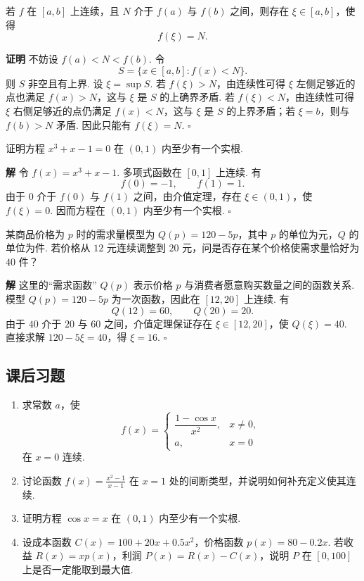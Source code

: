 \documentclass[fontset=fandol]{ctexart}
\newenvironment{proofdetail}{\par\noindent\textbf{证明}\quad}{\hfill$\square$\par\vspace{0.8em}}
\newenvironment{solution}{\par\noindent\textbf{解}\quad}{\hfill$\square$\par\vspace{0.8em}}
\begin{document}
\begin{theorem}[介值定理]
若 $f$ 在 $[a,b]$ 上连续，且 $N$ 介于 $f(a)$ 与 $f(b)$ 之间，则存在 $\xi\in[a,b]$，使得
\[
f(\xi)=N.
\]
\end{theorem}
\begin{proofdetail}
不妨设 $f(a)<N<f(b)$. 令
\[
S=\{x\in[a,b]:f(x)<N\}.
\]
则 $S$ 非空且有上界. 设 $\xi=\sup S$. 若 $f(\xi)>N$，由连续性可得 $\xi$ 左侧足够近的点也满足 $f(x)>N$，这与 $\xi$ 是 $S$ 的上确界矛盾. 若 $f(\xi)<N$，由连续性可得 $\xi$ 右侧足够近的点仍满足 $f(x)<N$，这与 $\xi$ 是 $S$ 的上界矛盾；若 $\xi=b$，则与 $f(b)>N$ 矛盾. 因此只能有 $f(\xi)=N$.
\end{proofdetail}

\begin{example}
证明方程 $x^3+x-1=0$ 在 $(0,1)$ 内至少有一个实根.
\end{example}
\begin{solution}
令 $f(x)=x^3+x-1$. 多项式函数在 $[0,1]$ 上连续. 有
\[
f(0)=-1,\qquad f(1)=1.
\]
由于 $0$ 介于 $f(0)$ 与 $f(1)$ 之间，由介值定理，存在 $\xi\in(0,1)$，使 $f(\xi)=0$. 因而方程在 $(0,1)$ 内至少有一个实根.
\end{solution}

\begin{example}
某商品价格为 $p$ 时的需求量模型为 $Q(p)=120-5p$，其中 $p$ 的单位为元，$Q$ 的单位为件. 若价格从 $12$ 元连续调整到 $20$ 元，问是否存在某个价格使需求量恰好为 $40$ 件？
\end{example}
\begin{solution}
这里的“需求函数” $Q(p)$ 表示价格 $p$ 与消费者愿意购买数量之间的函数关系. 模型 $Q(p)=120-5p$ 为一次函数，因此在 $[12,20]$ 上连续. 有
\[
Q(12)=60,\qquad Q(20)=20.
\]
由于 $40$ 介于 $20$ 与 $60$ 之间，介值定理保证存在 $\xi\in[12,20]$，使 $Q(\xi)=40$. 直接求解 $120-5\xi=40$，得 $\xi=16$.
\end{solution}

\subsection{课后习题}
\begin{enumerate}[label=\textbf{练习\arabic*.},leftmargin=2.2em]
\item 求常数 $a$，使
\[
f(x)=
\begin{cases}
\dfrac{1-\cos x}{x^2},&x\neq0,\\
a,&x=0
\end{cases}
\]
在 $x=0$ 连续.
\item 讨论函数 $f(x)=\frac{x^2-1}{x-1}$ 在 $x=1$ 处的间断类型，并说明如何补充定义使其连续.
\item 证明方程 $\cos x=x$ 在 $(0,1)$ 内至少有一个实根.
\item 设成本函数 $C(x)=100+20x+0.5x^2$，价格函数 $p(x)=80-0.2x$. 若收益 $R(x)=xp(x)$，利润 $P(x)=R(x)-C(x)$，说明 $P$ 在 $[0,100]$ 上是否一定能取到最大值.
\end{enumerate}
\end{document}
